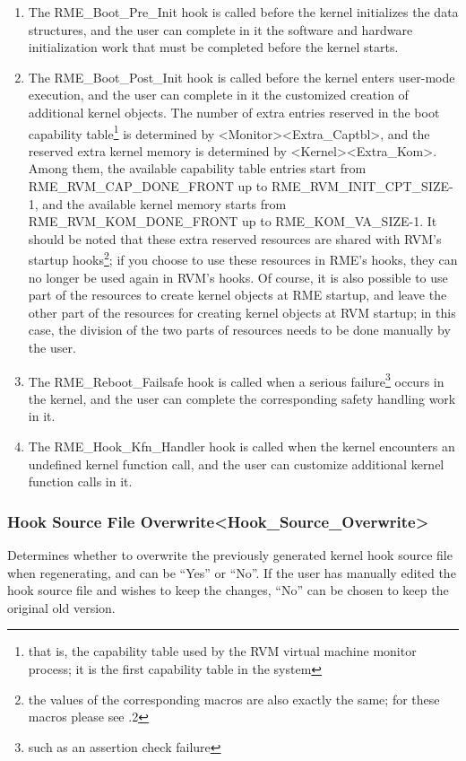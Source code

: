\begin{enumerate}
\def\labelenumi{\arabic{enumi}.}
\item
  The RME\_Boot\_Pre\_Init hook is called before the kernel initializes the data structures, and the user can complete in it the software and hardware initialization work that must be completed before the kernel starts.
\item
  The RME\_Boot\_Post\_Init hook is called before the kernel enters user-mode execution, and the user can complete in it the customized creation of additional kernel objects. The number of extra entries reserved in the boot capability table\footnote{that is, the capability table used by the RVM virtual machine monitor process; it is the first capability table in the system} is determined by <Monitor><Extra\_Captbl>, and the reserved extra kernel memory is determined by <Kernel><Extra\_Kom>. Among them, the available capability table entries start from RME\_RVM\_CAP\_DONE\_FRONT up to RME\_RVM\_INIT\_CPT\_SIZE-1, and the available kernel memory starts from RME\_RVM\_KOM\_DONE\_FRONT up to RME\_KOM\_VA\_SIZE-1. It should be noted that these extra reserved resources are shared with RVM's startup hooks\footnote{the values of the corresponding macros are also exactly the same; for these macros please see .2}; if you choose to use these resources in RME's hooks, they can no longer be used again in RVM's hooks. Of course, it is also possible to use part of the resources to create kernel objects at RME startup, and leave the other part of the resources for creating kernel objects at RVM startup; in this case, the division of the two parts of resources needs to be done manually by the user.
\item
  The RME\_Reboot\_Failsafe hook is called when a serious failure\footnote{such as an assertion check failure} occurs in the kernel, and the user can complete the corresponding safety handling work in it.
\item
  The RME\_Hook\_Kfn\_Handler hook is called when the kernel encounters an undefined kernel function call, and the user can customize additional kernel function calls in it.
\end{enumerate}

\subsubsection{Hook Source File Overwrite<Hook\_Source\_Overwrite>{}}\label{subsubsec:5-3-12-20}

Determines whether to overwrite the previously generated kernel hook source file when regenerating, and can be ``Yes'' or ``No''. If the user has manually edited the hook source file and wishes to keep the changes, ``No'' can be chosen to keep the original old version.

